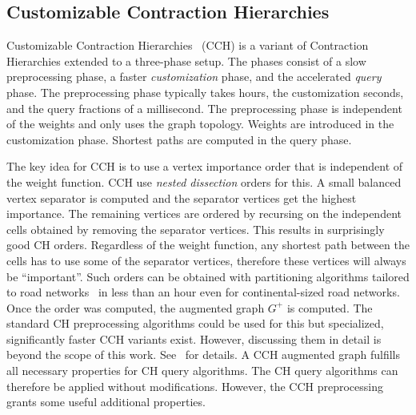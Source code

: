 \documentclass[manuscript,review]{acmart}
\begin{document}
\subsection{Customizable Contraction Hierarchies}
\label{sec:cch-intro}

Customizable Contraction Hierarchies~\cite{dsw-cch-15} (CCH) is a variant of Contraction Hierarchies extended to a three-phase setup.
The phases consist of a slow preprocessing phase, a faster \emph{customization} phase, and the accelerated \emph{query} phase.
The preprocessing phase typically takes hours, the customization seconds, and the query fractions of a millisecond.
The preprocessing phase is independent of the weights and only uses the graph topology.
Weights are introduced in the customization phase.
Shortest paths are computed in the query phase.

The key idea for CCH is to use a vertex importance order that is independent of the weight function.
CCH use \emph{nested dissection} orders for this.
A small balanced vertex separator is computed and the separator vertices get the highest importance.
The remaining vertices are ordered by recursing on the independent cells obtained by removing the separator vertices.
This results in surprisingly good CH orders.
Regardless of the weight function, any shortest path between the cells has to use some of the separator vertices, therefore these vertices will always be ``important''.
Such orders can be obtained with partitioning algorithms tailored to road networks~\cite{GottesburenHUW19} in less than an hour even for continental-sized road networks.
Once the order was computed, the augmented graph $G^+$ is computed.
The standard CH preprocessing algorithms could be used for this but specialized, significantly faster CCH variants exist.
However, discussing them in detail is beyond the scope of this work.
See~\cite{dsw-cch-15,DBLP:journals/jea/Buchhold0W19} for details.
A CCH augmented graph fulfills all necessary properties for CH query algorithms.
The CH query algorithms can therefore be applied without modifications.
However, the CCH preprocessing grants some useful additional properties.
\end{document}
